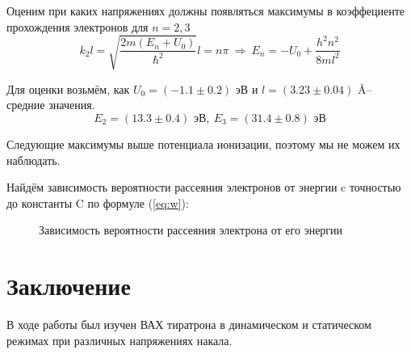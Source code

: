 \documentclass[a4paper, 12pt]{article}
\begin{document}
            Оценим при каких напряжениях должны появляться максимумы в коэффециенте прохождения электронов для $n = 2, 3$
            \[ k_2 l = \sqrt{\frac{2m (E_n + U_0)}{\hbar^2}} l = n \pi ~\Rightarrow~ E_n = - U_0 + \frac{h^2 n^2}{8m l^2}\]

            Для оценки возьмём, как $U_0 = (-1.1 \pm 0.2) \text{ эВ}$ и $l = (3.23 \pm 0.04)$ \AA -- средние значения.
            \[ E_2 = (13.3 \pm 0.4) \text{ эВ}, ~E_3 = (31.4 \pm 0.8) \text{ эВ} \]

            Следующие максимумы выше потенциала ионизации, поэтому мы не можем их наблюдать.

            Найдём зависимость вероятности рассеяния электронов от энергии c точностью до константы C по формуле (\ref{eq:w}):

            \begin{figure}[h!]
                \centering
                \qquad
                \caption{Зависимость вероятности рассеяния электрона от его энергии}%
            \end{figure}

    \section{Заключение}
        В ходе работы был изучен ВАХ тиратрона в динамическом и статическом режимах при различных напряжениях накала.
\end{document}
